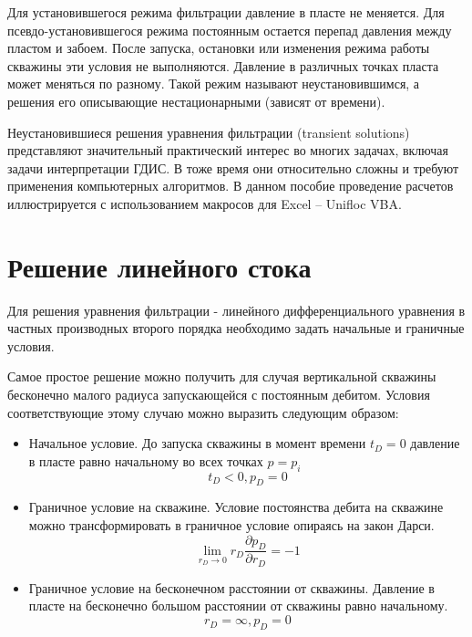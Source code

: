 Для установившегося режима фильтрации давление в пласте не меняется. Для псевдо-установившегося режима постоянным остается перепад давления между пластом и забоем. После запуска, остановки или изменения режима работы скважины эти условия не выполняются. Давление в различных точках пласта может меняться по разному. Такой режим называют неустановившимся, а решения его описывающие нестационарными (зависят от времени).

Неустановившиеся решения уравнения фильтрации (transient solutions) представляют значительный практический интерес во многих задачах, включая задачи интерпретации ГДИС. В тоже время они относительно сложны и требуют применения компьютерных алгоритмов. В данном пособие проведение расчетов иллюстрируется с использованием макросов для Excel -- Unifloc VBA.

\section{Решение линейного стока}

Для решения уравнения фильтрации - линейного дифференциального уравнения в частных производных второго порядка необходимо задать начальные и граничные условия. 

Самое простое решение можно получить для случая вертикальной скважины бесконечно малого радиуса запускающейся с постоянным дебитом. Условия соответствующие этому случаю можно выразить следующим образом:

\begin{itemize}
	\item Начальное условие. До запуска скважины в момент времени  $t_D = 0$ давление в пласте равно начальному во всех точках $p=p_i$
	$$ t_D < 0, p_D = 0 $$ 
	\item Граничное условие на скважине.  Условие постоянства дебита на скважине можно трансформировать в граничное условие опираясь на закон Дарси.
	$$ \lim_{r_D \to 0} {r_D \frac{\partial p_D}{\partial r_D}} = -1$$
	\item Граничное условие на бесконечном расстоянии от скважины. Давление в пласте на бесконечно большом расстоянии от скважины равно начальному.
	$$ r_D = \infty, p_D = 0$$
\end{itemize}

